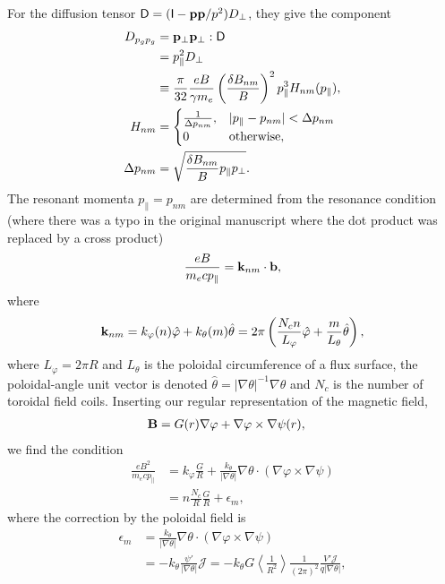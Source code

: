 \documentclass[11pt,a4paper]{article}
\renewcommand{\b}[1]{\ensuremath{ {\bf #1 } }}
\begin{document}
For the diffusion tensor $\mathsf{D} = (\mathsf{I}-\b{p}\b{p}/p^2)D_\perp$, they give the component
\begin{align}
D_{p_g p_g} &=  \b{p}_\perp\b{p}_\perp: \mathsf{D} \nonumber \\
&= p_\parallel^2 D_\perp  \nonumber \\
&\equiv \frac{\pi}{32}\frac{eB}{\gamma m_e}\left(\frac{\delta B_{nm}}{B}\right)^2 p_\parallel^3 H_{nm}(p_\parallel), \nonumber \\
H_{nm} &= \begin{cases}
\frac{1}{\Delta p_{nm}}, & |p_\parallel - p_{nm}| < \Delta p_{nm} \\
0 & \text{otherwise},
\end{cases} \nonumber \\
\Delta p_{nm} &= \sqrt{\frac{\delta B_{nm}}{B}p_\parallel p_\perp}.
\end{align}
The resonant momenta $p_\parallel = p_{nm}$ are determined from the resonance condition (where there was a typo in the original manuscript where the dot product was replaced by a cross product)
\begin{align}
\frac{eB}{m_e c p_\parallel} = \b{k}_{nm}\cdot \b{b}  ,
\end{align}
where 
\begin{align}
\b{k}_{nm} = k_\varphi(n) \hat\varphi + k_\theta(m) \hat\theta = 2\pi \left( \frac{N_c n}{L_\varphi} \hat\varphi + \frac{m}{L_\theta}\hat{\theta} \right),
\end{align}
where $L_\varphi = 2\pi R$ and $L_\theta$ is the poloidal circumference of a flux surface, the poloidal-angle unit vector is denoted $\hat{\theta} = |\nabla \theta|^{-1}\nabla \theta$ and $N_c$ is the number of toroidal field coils. Inserting our regular representation of the magnetic field,
\begin{align}
\b{B} &= G(r) \nabla \varphi + \nabla \varphi \times \nabla \psi(r),
\end{align}
we find the condition
\begin{align}
\frac{e B^2}{m_e c p_\parallel} &= k_\varphi \frac{G}{R} + \frac{k_\theta }{|\nabla \theta|} \nabla \theta \cdot(\nabla \varphi\times\nabla \psi) \nonumber \\
&= n\frac{N_c}{R}\frac{G}{R} + \epsilon_m,
\end{align}
where the correction by the poloidal field is 
\begin{align}
\epsilon_m &=  \frac{k_\theta }{|\nabla \theta|} \nabla \theta \cdot(\nabla \varphi\times\nabla \psi) \nonumber \\
&= - k_\theta\frac{\psi'}{|\nabla \theta|} \mathcal{J} = -k_\theta G \left\langle\frac{1}{R^2}\right\rangle \frac{1}{(2\pi)^2}\frac{V'\mathcal{J}}{q|\nabla \theta|},
\end{align}
\end{document}
